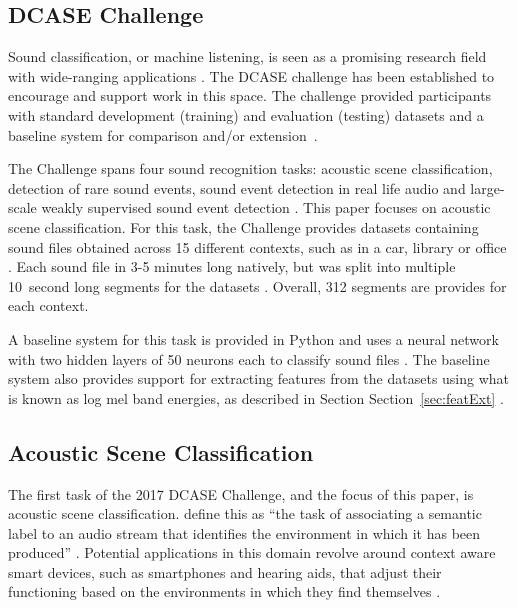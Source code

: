 \documentclass[11pt]{article}
\begin{document}
\subsection{DCASE Challenge}
\label{sec:DCASE}

Sound classification, or machine listening, is seen as a promising research field with wide-ranging applications \cite{Mesaros2017}. The DCASE challenge has been established to encourage and support work in this space. The challenge provided participants with standard development (training) and evaluation (testing) datasets \cite{Mesaros2016} and a baseline system for comparison and/or extension~\cite{Mesaros2017,DCASE2017asc}.

The Challenge spans four sound recognition tasks: acoustic scene classification, detection of rare sound events, sound event detection in real life audio and large-scale weakly supervised sound event detection \cite{Mesaros2017}. This paper focuses on acoustic scene classification. For this task, the Challenge provides datasets containing sound files obtained across 15 different contexts, such as in a car, library or office \cite{DCASE2017asc}. Each sound file in 3-5 minutes long natively, but was split into multiple 10~second long segments for the datasets \cite{DCASE2017asc}. Overall, 312 segments are provides for each context.

A baseline system for this task is provided in Python and uses a neural network with two hidden layers of 50 neurons each to classify sound files \cite{Mesaros2017}. The baseline system also provides support for extracting features from the datasets using what is known as log mel band energies, as described in Section Section~\ref{sec:featExt} \cite{Mesaros2017}. 





\subsection{Acoustic Scene Classification}
\label{sec:ASC}

The first task of the 2017 DCASE Challenge, and the focus of this paper, is acoustic scene classification. \citeauthor{Barchiesi2015} define this as ``the task of associating a semantic label to an audio stream that identifies the environment in which it has been produced'' \cite[p.~17]{Barchiesi2015}. Potential applications in this domain revolve around context aware smart devices, such as smartphones and hearing aids, that adjust their functioning based on the environments in which they find themselves \cite{Barchiesi2015}. 
\end{document}

